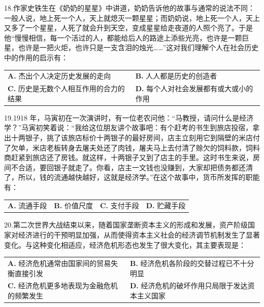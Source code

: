 \documentclass[UTF8,11pt]{ctexart}
\begin{document}
18.作家史铁生在《奶奶的星星》中讲道，奶奶告诉他的故事与通常的说法不同：一般人说，地上死一个人，天上就熄灭一颗星星；而奶奶说，地上死一个人，天上又多了一个星星，人死了就会升到天空，变成星星给走夜道的人照个亮了。于是他“慢慢相信，每一个活过的人，都能给后人的路途上添些光亮，也许是一颗巨星，也许是一把火炬，也许只是一支含泪的烛光……”这对我们理解个人在社会历史中的作用的启示有：


\begin{center}\begin{tabular}{>{\raggedright\arraybackslash}p{\dimexpr(\linewidth-4\tabcolsep)/2\relax}>{\raggedright\arraybackslash}p{\dimexpr(\linewidth-4\tabcolsep)/2\relax}}
\textbf{A.} 杰出个人决定历史发展的走向 & \textbf{B.} 人人都是历史的创造者\\[.35em]
\textbf{C.} 历史是无数个人相互作用的合力的结果 & \textbf{D.} 每个人对社会发展都有或大或小的作用\\[.35em]\end{tabular}\end{center}

19.1918 年，马寅初在一次演讲时，有一位老农问他：“马教授，请问什么是经济学？”马寅初笑着说：“我给这位朋友讲个故事吧：有个赶考的书生到旅店投宿，拿出十两银子，挑了该旅店标价十两银子的最好房间，店主立刻用它到隔壁的米店付了欠单，米店老板转身去屠夫处还了肉钱，屠夫马上去付清了赊欠的饲料款，饲料商赶紧到旅店还了房钱。就这样，十两银子又到了店主的手里。这时书生来说，房间不合适，要回银子就走了。你看，店主一文钱也没赚到，大家却把债务都还清了，所以，钱的流通越快越好，这就是经济学。”在这个故事中，货币所发挥的职能有：


\begin{center}\begin{tabular}{>{\raggedright\arraybackslash}p{\dimexpr(\linewidth-8\tabcolsep)/4\relax}>{\raggedright\arraybackslash}p{\dimexpr(\linewidth-8\tabcolsep)/4\relax}>{\raggedright\arraybackslash}p{\dimexpr(\linewidth-8\tabcolsep)/4\relax}>{\raggedright\arraybackslash}p{\dimexpr(\linewidth-8\tabcolsep)/4\relax}}
\textbf{A.} 流通手段 & \textbf{B.} 价值尺度 & \textbf{C.} 支付手段 & \textbf{D.} 贮藏手段\\[.35em]\end{tabular}\end{center}

20.第二次世界大战结束以来，随着国家垄断资本主义的形成和发展，资产阶级国家对经济进行的干预明显加强，从而使得资本主义社会的经济调节机制发生了显著变化。与这种变化相适应，经济危机形态也发生了很大变化，其主要表现是：


\begin{center}\begin{tabular}{>{\raggedright\arraybackslash}p{\dimexpr(\linewidth-4\tabcolsep)/2\relax}>{\raggedright\arraybackslash}p{\dimexpr(\linewidth-4\tabcolsep)/2\relax}}
\textbf{A.} 经济危机通常由国家间的贸易失衡直接引发 & \textbf{B.} 经济危机各阶段的交替过程已不十分明显\\[.35em]
\textbf{C.} 经济危机更多地表现为金融危机的频繁发生 & \textbf{D.} 经济危机的破坏作用只局限于发达资本主义国家\\[.35em]\end{tabular}\end{center}
\end{document}
